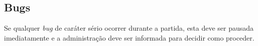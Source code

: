 \subsection{Bugs}

Se qualquer \textit{bug} de caráter sério ocorrer durante a partida, esta deve ser pausada imediatamente e a administração deve ser informada para decidir como proceder.
